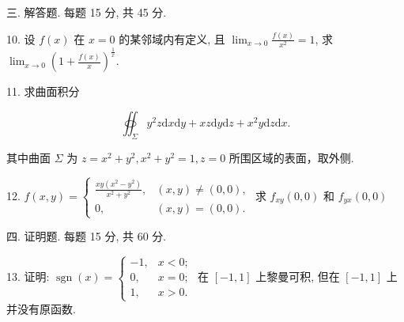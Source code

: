 \documentclass{examcollection}
\renewcommand{\displayformula}[1]{\[#1\]}
\begin{document}
{\begin{minipage}{\textwidth}
三. 解答题. 每题 15 分, 共 45 分.\par
10. 设 $f(x)$ 在 $x = 0$ 的某邻域内有定义, 且 $\lim_{x \to 0} \frac{f(x)}{x^2} = 1$, 求 $\lim_{x \to 0} \left(1 + \frac{f(x)}{x}\right)^{\frac{1}{x}}$.\par
11. 求曲面积分\par
\displayformula{\oiint_ {\Sigma} y ^ {2} z \mathrm{d} x \mathrm{d} y + x z \mathrm{d} y \mathrm{d} z + x ^ {2} y \mathrm{d} z \mathrm{d} x.}\par
其中曲面 $\Sigma$ 为 $z = x^{2} + y^{2}, x^{2} + y^{2} = 1, z = 0$ 所围区域的表面，取外侧.\par
12. $f(x,y) = \left\{ \begin{array}{ll}\frac{xy(x^2 - y^2)}{x^2 + y^2}, & (x,y)\neq (0,0),\\ 0, & (x,y) = (0,0). \end{array} \right.$ 求 $f_{xy}(0,0)$ 和 $f_{yx}(0,0)$\par
四. 证明题. 每题 15 分, 共 60 分.\par
13. 证明: $\operatorname{sgn}(x)=\begin{cases}-1,&x<0;\\0,&x=0;\\1,&x>0.\end{cases}$ 在 $[-1,1]$ 上黎曼可积, 但在 $[-1,1]$ 上并没有原函数.\par
\end{minipage}}
\ifdim\dimexpr\ht\proofbox+\dp\proofbox\relax>\textheight
\noindent\resizebox{!}{\textheight}{\usebox{\proofbox}}\else\noindent\usebox{\proofbox}\fi\clearpage
\end{document}
